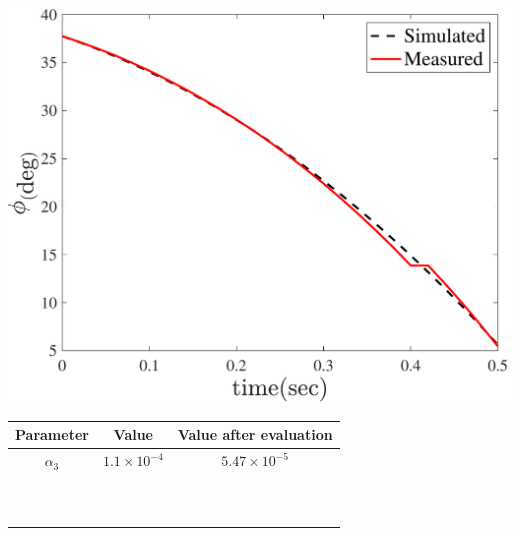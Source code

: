\documentclass[3p,times]{elsarticle}
\newcommand\Tstrut{\rule{0pt}{2.6ex}}         %
\begin{document}
\begin{minipage}[t]{0.95\linewidth}
	\hfill
    \begin{minipage}[b]{0.48\linewidth}
		\centering
		\includegraphics[width=1\linewidth]{../Figure/parameter_estimation/roll/roll}
		\captionsetup{justification=centering}
	\end{minipage}
	\begin{minipage}[b]{0.49\linewidth}
		\centering
		\begin{tabular}{ccc}\hline
			Parameter & Value & Value after evaluation
            \Tstrut\\ \hline
			$\alpha_3$  & $1.1\times10^{-4}$ & $5.47\times10^{-5}$  \Tstrut\\ \hline
			\\
			\\\\\\\\\\\\\\\\\\
		\end{tabular}
	\captionsetup{justification=centering}
	\end{minipage}
    \vspace{1cm}
\end{minipage}
\end{document}
